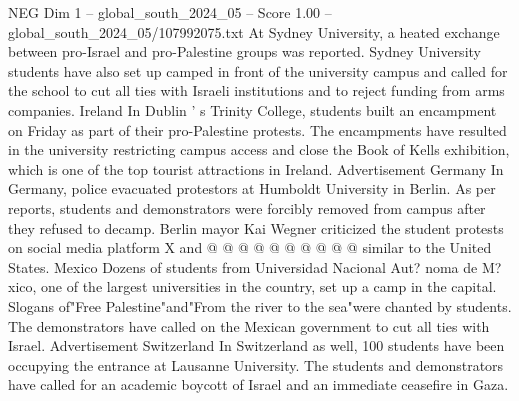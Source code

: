 \begin{textsample}{NEG Dim 1 – global\_south\_2024\_05 – Score 1.00 – global\_south\_2024\_05/107992075.txt}
At Sydney University, a heated exchange between pro-Israel and pro-Palestine groups was reported.
Sydney University students have also set up camped in front of the university campus and called for the school to cut all ties with Israeli institutions and to reject funding from arms companies.
Ireland In Dublin ' s Trinity College, students built an encampment on Friday as part of their pro-Palestine protests.
The encampments have resulted in the university restricting campus access and close the Book of Kells exhibition, which is one of the top tourist attractions in Ireland.
Advertisement Germany In Germany, police evacuated protestors at Humboldt University in Berlin.
As per reports, students and demonstrators were forcibly removed from campus after they refused to decamp.
Berlin mayor Kai Wegner criticized the student protests on social media platform X and @ @ @ @ @ @ @ @ @ @ similar to the United States.
Mexico Dozens of students from Universidad Nacional Aut? noma de M? xico, one of the largest universities in the country, set up a camp in the capital.
Slogans of"Free Palestine"and"From the river to the sea"were chanted by students.
The demonstrators have called on the Mexican government to cut all ties with Israel.
Advertisement Switzerland In Switzerland as well, 100 students have been occupying the entrance at Lausanne University.
The students and demonstrators have called for an academic boycott of Israel and an immediate ceasefire in Gaza.

\end{textsample}
